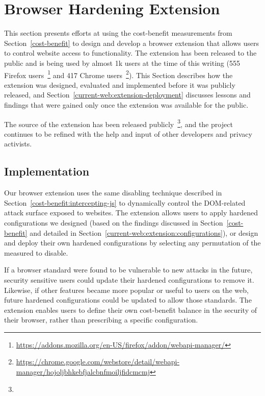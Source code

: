 \section{Browser Hardening Extension}
\label{current-web:extension}

This section presents efforts at using the cost-benefit measurements
from Section~\ref{cost-benefit} to design and develop a browser extension
that allows users to control website access to \WAPI functionality.
The extension has been released to the public and is being used by almost
1k users at the time of this writing (555 Firefox users~\footnote{\url{https://addons.mozilla.org/en-US/firefox/addon/webapi-manager/}} and
417 Chrome users~\footnote{\url{https://chrome.google.com/webstore/detail/webapi-manager/hojoljbhkebfjalcbnfmoiljfidcmcmj}}).
This Section describes how the
extension was designed, evaluated and implemented before it was publicly
released, and Section~\ref{current-web:extension-deployment} discusses lessons
and findings that were gained only once the extension was available for the
public.

The source of the extension has been released publicly~\footnote{\ExtensionSourceUrl},
and the project continues to be refined with the help and input of other
developers and privacy activists.


\subsection{Implementation}
Our browser extension uses the same \WAS disabling technique described in
Section~\ref{cost-benefit:intercepting-js} to dynamically control the DOM-related
attack surface exposed to websites.  The extension allows users to
apply hardened configurations we designed (based on the findings
discussed in Section~\ref{cost-benefit} and detailed in
Section~\ref{current-web:extension:configurations}), or design and deploy
their own hardened configurations by selecting any permutation of the
\NumStandards measured \WASs to disable.

If a browser standard were found to be vulnerable to new attacks in the future,
security sensitive users could update their hardened configurations to remove it.
Likewise, if other features became more popular or useful to users on the web,
future hardened configurations could be updated to allow those standards.
The extension enables users to define their own cost-benefit balance in the security
of their browser, rather than prescribing a specific configuration.

